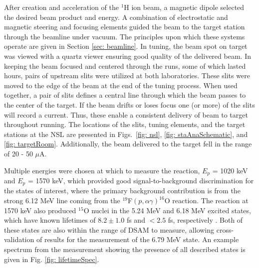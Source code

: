 After creation and acceleration of the $^{1}$H ion beam, a magnetic dipole selected the desired beam product and energy. A combination of electrostatic and magnetic steering and focusing elements guided the beam to the target station through the beamline under vacuum. The principles upon which these systems operate are given in Section \ref{sec: beamline}. In tuning, the beam spot on target was viewed with a quartz viewer ensuring good quality of the delivered beam. In keeping the beam focused and centered through the runs, some of which lasted hours, pairs of upstream slits were utilized at both laboratories. These slits were moved to the edge of the beam at the end of the tuning process. When used together, a pair of slits defines a central line through which the beam passes to the center of the target. If the beam drifts or loses focus one (or more) of the slits will record a current. Thus, these enable a consistent delivery of beam to target throughout running. The locations of the slits, tuning elements, and the target stations at the NSL are presented in Figs.\ \ref{fig: nsl}, \ref{fig: staAnaSchematic}, and \ref{fig: targetRoom}. Additionally, the beam delivered to the target fell in the range of 20 - 50 $\mu$A.

Multiple energies were chosen at which to measure the reaction, $E_{p}$ = 1020 keV and $E_{p}$ = 1570 keV, which provided good signal-to-background discrimination for the states of interest, where the primary background contribution is from the strong 6.12 MeV line coming from the $^{19}$F$\left( p, \alpha\gamma \right)^{16}$O reaction. The reaction at 1570 keV also produced $^{15}$O nuclei in the 5.24 MeV and 6.18 MeV excited states, which have known lifetimes of $8.2 \pm 1.0$ fs and $< 2.5$ fs, respectively \cite{Ajzenberg-Selove1991}. Both of these states are also within the range of DSAM to measure, allowing cross-validation of results for the measurement of the 6.79 MeV state. An example spectrum from the measurement showing the presence of all described states is given in Fig. \ref{fig: lifetimeSpec}.



